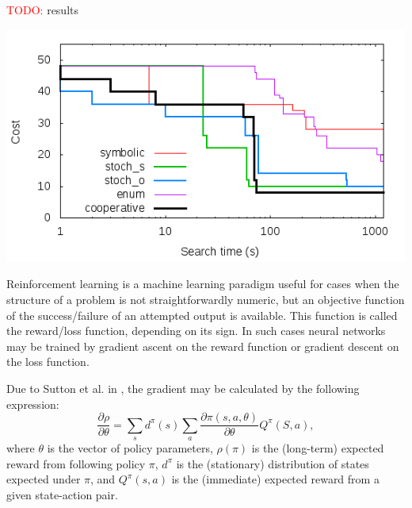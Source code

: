 \documentclass[12pt,twoside]{reedthesis}
\newcommand{\red}[1]{\textcolor{red}{#1}}
\begin{document}
\red{TODO:} results

\includegraphics[scale=0.5]{scaling}



Reinforcement learning is a machine learning paradigm useful for cases when the structure of a problem is not straightforwardly numeric, but an objective function of the success/failure of an attempted output is available. This function is called the reward/loss function, depending on its sign. In such cases neural networks may be trained by gradient ascent on the reward function or gradient descent on the loss function.


Due to Sutton et al. in \cite{sutton1999policygradient}, the gradient may be calculated by the following expression:
\[
    \frac{\partial \rho}{\partial \theta} = \sum_s d^\pi(s) \sum_a \frac{\partial \pi(s,a, \theta)}{\partial \theta}Q^\pi(S,a),
\]
where $\theta$ is the vector of policy parameters, $\rho(\pi)$ is the (long-term) expected reward from following policy $\pi$, $d^\pi$ is the (stationary) distribution of states expected under $\pi$, and $Q^\pi(s,a)$ is the (immediate) expected reward from a given state-action pair.
\end{document}

